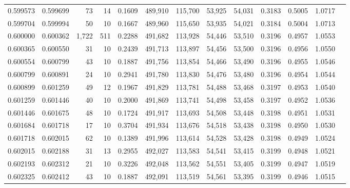 \begin{tabular}{rrrrrrrrrrrrr}
0.599573 & 0.599699 &    73 &  14 &                                     0.1609 & 489,910 & 115,700 &  53,925 &  54,031 & 0.3183 & 0.5005 & 1.0717 \\
0.599704 & 0.599994 &    50 &  10 &                                     0.1667 & 489,960 & 115,650 &  53,935 &  54,021 & 0.3184 & 0.5004 & 1.0713 \\
0.600000 & 0.600362 & 1,722 & 511 &                                     0.2288 & 491,682 & 113,928 &  54,446 &  53,510 & 0.3196 & 0.4957 & 1.0553 \\
0.600365 & 0.600550 &    31 &  10 &                                     0.2439 & 491,713 & 113,897 &  54,456 &  53,500 & 0.3196 & 0.4956 & 1.0550 \\
0.600554 & 0.600799 &    43 &  10 &                                     0.1887 & 491,756 & 113,854 &  54,466 &  53,490 & 0.3196 & 0.4955 & 1.0546 \\
0.600799 & 0.600891 &    24 &  10 &                                     0.2941 & 491,780 & 113,830 &  54,476 &  53,480 & 0.3196 & 0.4954 & 1.0544 \\
0.600899 & 0.601259 &    49 &  12 &                                     0.1967 & 491,829 & 113,781 &  54,488 &  53,468 & 0.3197 & 0.4953 & 1.0540 \\
0.601259 & 0.601446 &    40 &  10 &                                     0.2000 & 491,869 & 113,741 &  54,498 &  53,458 & 0.3197 & 0.4952 & 1.0536 \\
0.601446 & 0.601675 &    48 &  10 &                                     0.1724 & 491,917 & 113,693 &  54,508 &  53,448 & 0.3198 & 0.4951 & 1.0531 \\
0.601684 & 0.601718 &    17 &  10 &                                     0.3704 & 491,934 & 113,676 &  54,518 &  53,438 & 0.3198 & 0.4950 & 1.0530 \\
0.601718 & 0.602015 &    62 &  10 &                                     0.1389 & 491,996 & 113,614 &  54,528 &  53,428 & 0.3198 & 0.4949 & 1.0524 \\
0.602015 & 0.602188 &    31 &  13 &                                     0.2955 & 492,027 & 113,583 &  54,541 &  53,415 & 0.3199 & 0.4948 & 1.0521 \\
0.602193 & 0.602312 &    21 &  10 &                                     0.3226 & 492,048 & 113,562 &  54,551 &  53,405 & 0.3199 & 0.4947 & 1.0519 \\
0.602325 & 0.602412 &    43 &  10 &                                     0.1887 & 492,091 & 113,519 &  54,561 &  53,395 & 0.3199 & 0.4946 & 1.0515 \\

\end{tabular}
